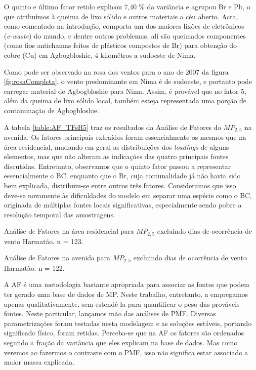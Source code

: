 O quinto e último fator retido explicou 7,40 \% da variância e agrupou
Br e Pb, o que atribuímos à queima de lixo sólido e outros materiais a céu 
aberto. Acra, como comentado na introdução, comporta um dos maiores lixões de 
eletrônicos (\textit{e-waste}) do mundo, e dentre outros problemas, ali são 
queimados componentes (como fios antichamas feitos de plásticos compostos de Br) 
para obtenção do cobre (Cu) em Agbogbloshie, 4 kilomêtros a sudoeste de Nima. 

Como pode ser observado na rosa dos ventos para o ano de 2007 da figura 
\ref{fg:rosaCompleta}, o vento predominante em Nima é de sudoeste, 
e portanto pode carregar material de Agbogbloshie para Nima. 
Assim, é provável que no fator 5, além da queima de lixo sólido local, 
também esteja representada uma porção de contaminação de Agbogbloshie.

A tabela \ref{table:AF_TFsH5} traz os resultados da Análise de Fatores do 
$MP_{2,5}$ na avenida. Os fatores principais extraídos 
foram essencialmente os mesmos que na área residencial, mudando em geral as
distribuições dos \textit{loadings} de alguns elementos, mas que não alteram 
as indicações das quatro principais fontes discutidas. Entretanto, observamos 
que o quinto fator passou a representar essencialmente o BC, enquanto que o Br, 
cuja comunalidade já não havia sido bem explicada, distribuiu-se entre outros 
três fatores. Consideramos que isso deve-se novamente às dificuldades do modelo
em separar uma espécie como o BC, originada de múltiplas fontes locais 
significativas, especialmente sendo pobre a resolução temporal das amostragens.

\newpage
\begin{table}[H]
  \centering
  
  \caption{Análise de Fatores na área residencial para $MP_{2,5}$
           excluindo dias de ocorrência de vento Harmatão. n = 123.
          \label{table:AF_RFsH5}}
\end{table}

\begin{table}[H]
  \centering
  
  \caption{Análise de Fatores na avenida para $MP_{2,5}$
           excluindo dias de ocorrência de vento Harmatão. n = 122.
          \label{table:AF_TFsH5}}
\end{table}
\newpage

A AF é uma metodologia bastante apropriada para associar as fontes que podem 
ter gerado uma base de dados de MP. Neste trabalho, entretanto, a empregamos 
apenas qualitativamente, sem estendê-la para quantificar o peso das prováveis 
fontes. Neste particular, lançamos mão das análises de PMF. Diversas 
parametrizações foram testadas nesta modelagem e as soluções estáveis, portando 
significado físico, foram retidas. Perceba-se que na AF os fatores são ordenados
segundo a fração da variância que eles explicam na base de dados. 
Mas como veremos ao fazermos o contraste com o PMF, isso não significa estar 
associado a maior massa explicada.

